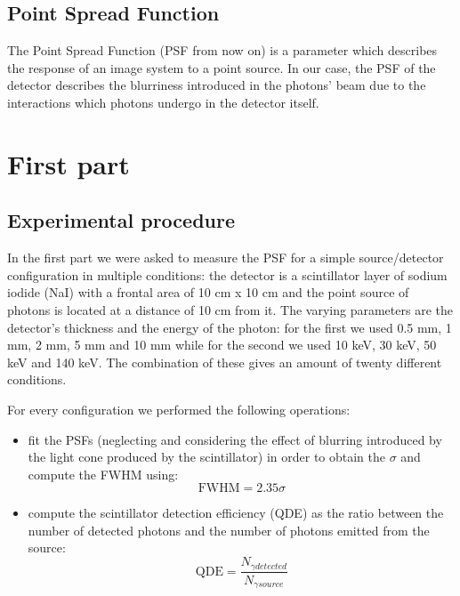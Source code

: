 \documentclass[a4paper]{article}
\begin{document}
\subsection{Point Spread Function}
The Point Spread Function (PSF from now on) is a parameter which describes the response of an image system to a point source. In our case, the PSF of the detector describes the blurriness introduced in the photons' beam due to the interactions which photons undergo in the detector itself.

\section{First part}
\subsection{Experimental procedure}
In the first part we were asked to measure the PSF for a simple source/detector configuration in multiple conditions: the detector is a scintillator layer of sodium iodide (NaI) with a frontal area of 10 cm x 10 cm and the point source of photons is located at a distance of 10 cm from it. The varying parameters are the detector's thickness and the energy of the photon: for the first we used 0.5 mm, 1 mm, 2 mm, 5 mm and 10 mm while for the second we used 10 keV, 30 keV, 50 keV and 140 keV. The combination of these gives an amount of twenty different conditions.

For every configuration we performed the following operations:
\begin{itemize}
  \item fit the PSFs (neglecting and considering the effect of blurring introduced by the light cone produced by the scintillator) in order to obtain the $\sigma$ and compute the FWHM using:
    \begin{equation}
      \text{FWHM}=2.35\sigma
      \label{eq:fwhm}
    \end{equation}
  \item compute the scintillator detection efficiency (QDE) as the ratio between the number of detected photons and the number of photons emitted from the source:
    \begin{equation}
      \text{QDE}=\frac{N_{\gamma detected}}{N_{\gamma source}}
      \label{eq:qde}
    \end{equation}
\end{itemize}
\end{document}
